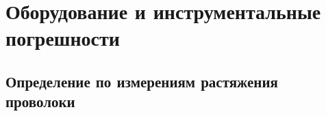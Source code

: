 \section{Оборудование и инструментальные погрешности}
\subsection{Определение по измерениям растяжения проволоки}

\begin{figure}[h!]
\end{figure}
\begin{figure}[h!]
\end{figure}

